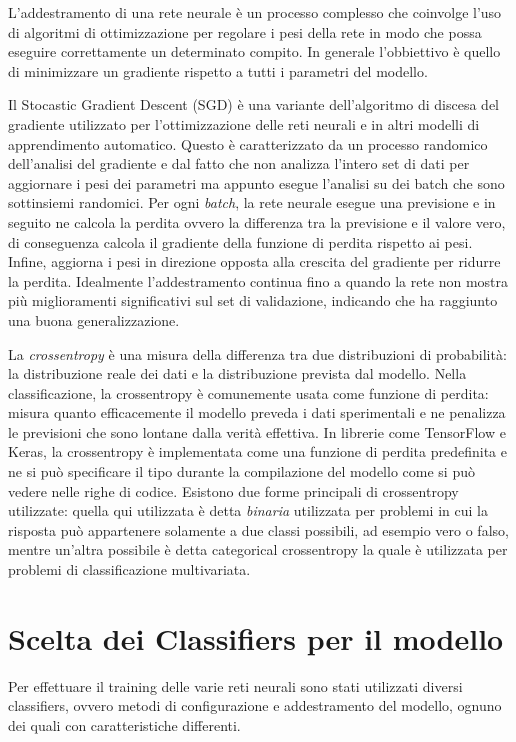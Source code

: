 
    L’addestramento di una rete neurale è un processo complesso che coinvolge l’uso di algoritmi di ottimizzazione per regolare i pesi della rete in modo che possa eseguire correttamente un determinato compito. In generale l’obbiettivo è quello di minimizzare un gradiente rispetto a tutti i parametri del modello.

    Il Stocastic Gradient Descent (SGD) è una variante dell’algoritmo di discesa del gradiente utilizzato per l’ottimizzazione delle reti neurali e in altri modelli di apprendimento automatico. Questo è caratterizzato da un processo randomico dell’analisi del gradiente e dal fatto che non analizza l’intero set di dati per aggiornare i pesi dei parametri ma appunto esegue l’analisi su dei batch che sono sottinsiemi randomici. Per ogni \textit{batch}, la rete neurale esegue una previsione e in seguito ne calcola la perdita ovvero la differenza tra la previsione e il valore vero, di conseguenza calcola il gradiente della funzione di perdita rispetto ai pesi. Infine, aggiorna i pesi in direzione opposta alla crescita del gradiente per ridurre la perdita. Idealmente l’addestramento continua fino a quando la rete non mostra più miglioramenti significativi sul set di validazione, indicando che ha raggiunto una buona generalizzazione.

    La \textit{crossentropy} è una misura della differenza tra due distribuzioni di probabilità: la distribuzione reale dei dati e la distribuzione prevista dal modello. Nella classificazione, la crossentropy è comunemente usata come funzione di perdita: misura quanto efficacemente il modello preveda i dati sperimentali e ne penalizza le previsioni che sono lontane dalla verità effettiva. In librerie come TensorFlow e Keras, la crossentropy è implementata come una funzione di perdita predefinita e ne si può specificare il tipo durante la compilazione del modello come si può vedere nelle righe di codice. Esistono due forme principali di crossentropy utilizzate: quella qui utilizzata è detta \textit{binaria} utilizzata per problemi in cui la risposta può appartenere solamente a due classi possibili, ad esempio vero o falso, mentre un'altra possibile è detta categorical crossentropy la quale è utilizzata per problemi di classificazione multivariata.

\newpage

\section{Scelta dei Classifiers per il modello}
    Per effettuare il training delle varie reti neurali sono stati utilizzati diversi classifiers, ovvero metodi di configurazione e addestramento del modello, ognuno dei quali con caratteristiche differenti.


